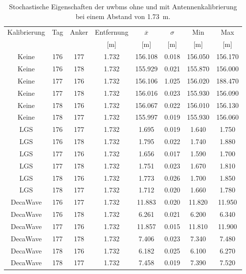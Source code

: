 \begin{table}[h]
	\centering
	\begin{tabular}{||c||cc||ccc|cc||}
\hline
Kalibrierung & Tag & Anker & Entfernung & $\overline{x}$ & $\sigma$ & Min & Max \\
 & & & [\si{\meter}] & [\si{\meter}] & [\si{\meter}] & [\si{\meter}] & [\si{\meter}] \\
\hline
\hline
Keine & 176 & 177 & \num{1.732} & \num{156.108} & \num{0.018} & \num{156.050} & \num{156.170} \\
Keine & 176 & 178 & \num{1.732} & \num{155.929} & \num{0.021} & \num{155.870} & \num{156.000} \\
Keine & 177 & 176 & \num{1.732} & \num{156.106} & \num{1.025} & \num{156.020} & \num{188.470} \\
Keine & 177 & 178 & \num{1.732} & \num{156.016} & \num{0.023} & \num{155.930} & \num{156.090} \\
Keine & 178 & 176 & \num{1.732} & \num{156.067} & \num{0.022} & \num{156.010} & \num{156.130} \\
Keine & 178 & 177 & \num{1.732} & \num{155.997} & \num{0.019} & \num{155.930} & \num{156.060} \\
\hline
LGS & 176 & 177 & \num{1.732} & \num{1.695} & \num{0.019} & \num{1.640} & \num{1.750} \\
LGS & 176 & 178 & \num{1.732} & \num{1.795} & \num{0.022} & \num{1.740} & \num{1.880} \\
LGS & 177 & 176 & \num{1.732} & \num{1.656} & \num{0.017} & \num{1.590} & \num{1.700} \\
LGS & 177 & 178 & \num{1.732} & \num{1.751} & \num{0.023} & \num{1.670} & \num{1.810} \\
LGS & 178 & 176 & \num{1.732} & \num{1.773} & \num{0.026} & \num{1.700} & \num{1.850} \\
LGS & 178 & 177 & \num{1.732} & \num{1.712} & \num{0.020} & \num{1.660} & \num{1.780} \\
\hline
DecaWave & 176 & 177 & \num{1.732} & \num{11.883} & \num{0.020} & \num{11.820} & \num{11.950} \\
DecaWave & 176 & 178 & \num{1.732} & \num{6.261} & \num{0.021} & \num{6.200} & \num{6.340} \\
DecaWave & 177 & 176 & \num{1.732} & \num{11.857} & \num{0.015} & \num{11.810} & \num{11.900} \\
DecaWave & 177 & 178 & \num{1.732} & \num{7.406} & \num{0.023} & \num{7.340} & \num{7.480} \\
DecaWave & 178 & 176 & \num{1.732} & \num{6.182} & \num{0.025} & \num{6.100} & \num{6.270} \\
DecaWave & 178 & 177 & \num{1.732} & \num{7.458} & \num{0.019} & \num{7.390} & \num{7.520} \\
\hline
	\end{tabular}
	\caption{Stochastische Eigenschaften der \Glspl{uwbm} ohne und mit Antennenkalibrierung bei einem Abstand von \SI{1.73}{\meter}.}
	\label{tab:calibration_range_results}
\end{table}

